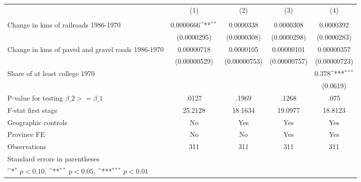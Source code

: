 {
\def\sym#1{\ifmmode^{#1}\else\(^{#1}\)\fi}
\begin{tabular}{l*{4}{c}}
\hline\hline
                &\multicolumn{1}{c}{(1)}&\multicolumn{1}{c}{(2)}&\multicolumn{1}{c}{(3)}&\multicolumn{1}{c}{(4)}\\
                &\multicolumn{1}{c}{}&\multicolumn{1}{c}{}&\multicolumn{1}{c}{}&\multicolumn{1}{c}{}\\
\hline
Change in kms of railroads 1986-1970&0.0000666\sym{**} &0.0000338         &0.0000308         &0.0000392         \\
                &(0.0000295)         &(0.0000308)         &(0.0000298)         &(0.0000283)         \\
[1em]
Change in kms of paved and gravel roads 1986-1970&0.00000718         &0.0000105         &0.00000101         &0.00000357         \\
                &(0.00000529)         &(0.00000753)         &(0.00000757)         &(0.00000723)         \\
[1em]
Share of at least college 1970&                  &                  &                  &    0.378\sym{***}\\
                &                  &                  &                  & (0.0619)         \\
\hline
P-value for testing $\beta\_{2} >= \beta\_{1}$&    .0127         &    .1969         &    .1268         &     .075         \\
F-stat first stage&  25.2128         &  18.1634         &  19.0977         &  18.8123         \\
Geographic controls&       No         &      Yes         &      Yes         &      Yes         \\
Province FE     &       No         &       No         &      Yes         &      Yes         \\
Observations    &      311         &      311         &      311         &      311         \\
\hline\hline
\multicolumn{5}{l}{\footnotesize Standard errors in parentheses}\\
\multicolumn{5}{l}{\footnotesize \sym{*} \(p<0.10\), \sym{**} \(p<0.05\), \sym{***} \(p<0.01\)}\\
\end{tabular}
}
